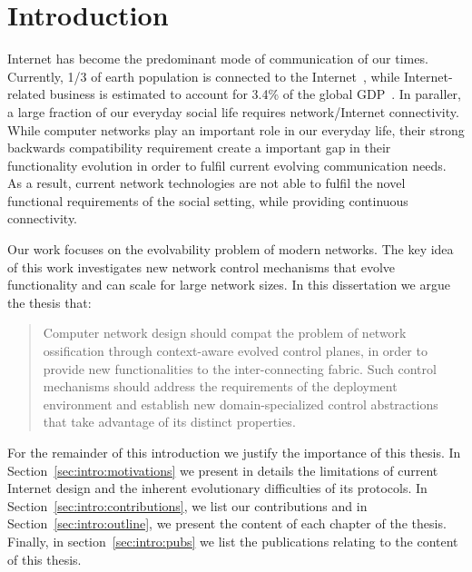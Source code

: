 \chapter{Introduction} \ifpdf
\graphicspath{{Introduction/IntroductionFigs/PNG/}{Introduction/IntroductionFigs/PDF/}{Introduction/IntroductionFigs/}}
\else
\graphicspath{{Introduction/IntroductionFigs/EPS/}{Introduction/IntroductionFigs/}}
\fi

Internet has become the predominant mode of communication of our times.
Currently, 1/3 of earth population is connected to the
Internet~\cite{itufacts2011}, while Internet-related business is estimated to
account for 3.4\% of the global GDP~\cite{duRausas:2011un}. In paraller, a large
fraction of our everyday social life requires network/Internet connectivity.
While computer networks play an important role in our everyday life, their
strong backwards compatibility requirement create a important gap in their
functionality evolution in order to fulfil current evolving communication needs.
As a result, current network technologies are not able to fulfil the novel
functional requirements of the social setting, while providing continuous
connectivity.

Our work focuses on the evolvability problem of modern networks. The key idea of
this work  investigates new network control mechanisms that evolve functionality
and can scale for large network sizes. In this dissertation we argue the thesis that: 

\begin{quotation} 
  Computer network design should compat the problem of network
  ossification through context-aware evolved control planes, in order to provide
  new functionalities to the inter-connecting fabric. Such control
  mechanisms should address the requirements of the deployment environment
  and establish new domain-specialized control abstractions that take advantage 
  of its distinct properties. 
\end{quotation}

For the remainder of this introduction we justify the importance of this thesis.
In Section~\ref{sec:intro:motivations} we present in details the limitations of
current Internet design and the inherent evolutionary difficulties of its
protocols. In Section~\ref{sec:intro:contributions}, we list our contributions and
in Section~\ref{sec:intro:outline}, we present the content of each chapter of
the thesis. Finally, in section~\ref{sec:intro:pubs} we list the publications
relating to the content of this thesis. 

